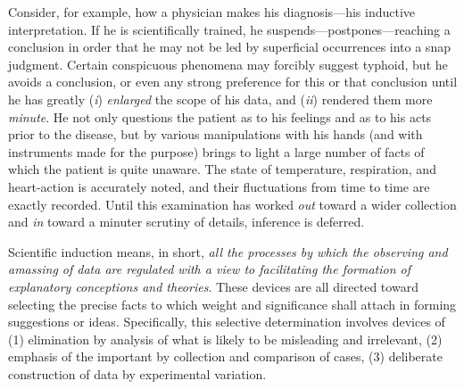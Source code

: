 \documentclass[showtrims,ustradepaper]{memoir}
\begin{document}

Consider, for example, how a physician makes his diagnosis---his
inductive interpretation. If he is scientifically trained, he
suspends---postpones---reaching a conclusion in order that he may not be
led by superficial occurrences into a snap judgment. Certain conspicuous
phenomena may forcibly suggest typhoid, but he avoids a conclusion, or
even any strong preference for this or that conclusion until he has
greatly (\emph{i}) \emph{enlarged} the scope of his data, and
(\emph{ii}) rendered them more \emph{minute}. He not only questions the
patient as to his feelings and as to his acts prior to the disease, but
by various manipulations with his hands (and with instruments made for
the purpose) brings to light a large number of facts of which the
patient is quite unaware. The state of
temperature,
respiration, and heart-action is accurately noted, and their
fluctuations from time to time are exactly recorded. Until this
examination has worked \emph{out} toward a wider collection and
\emph{in} toward a minuter scrutiny of details, inference is deferred.


Scientific induction means, in short, \emph{all the processes by which
the observing and amassing of data are regulated with a view to
facilitating the formation of explanatory conceptions and theories}.
These devices are all directed toward selecting the precise facts to
which weight and significance shall attach in forming suggestions or
ideas. Specifically, this selective determination involves devices of
(1) elimination by analysis of what is likely to be misleading and
irrelevant, (2) emphasis of the important by collection and comparison
of cases, (3) deliberate construction of data by experimental variation.

\end{document}
